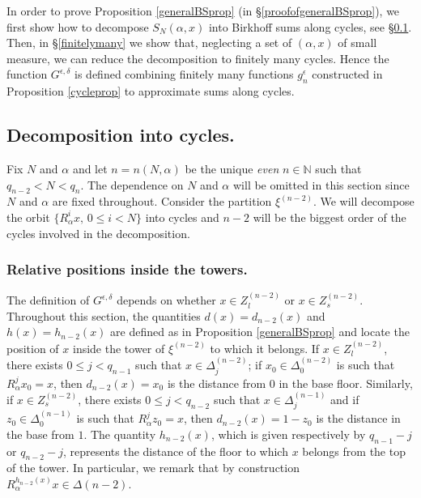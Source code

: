 \documentclass{conm-p-l}
\numberwithin{equation}{section}
\begin{document}
In order to prove Proposition \ref{generalBSprop} (in \S \ref{proofofgeneralBSprop}), we
first show how to decompose ${S_{{N}}({\alpha}, {{x}})}$ into Birkhoff sums along
cycles, see \S\ref{cycledecomp}. Then, in \S\ref{finitelymany} we show that,
neglecting a  set of $(\alpha, {x})$ of small measure, we can reduce the
decomposition to finitely many cycles. Hence the function $G^{\epsilon, \delta}$ is
defined combining finitely many functions  $g_n^{\epsilon} $ constructed in Proposition
\ref{cycleprop} to approximate sums along cycles.

\subsection{Decomposition into cycles.}\label{cycledecomp}
Fix $N$ and $\alpha$ and let $n = n(N, \alpha)$ 
 be the unique \emph{even} $n\in \mathbb{N}$ such that $q_{n-2} < N < q_{n}$. The dependence on $N$ and $\alpha$ will be omitted in this section since $N$ and $\alpha$ are fixed throughout. Consider the partition $\xi^{(n-2)}$. We will decompose the orbit $\{R_{\alpha}^i x, \, 0\leq i < N \}$ into cycles and $n-2$ will be the biggest order of the cycles involved in the decomposition.

\subsubsection{Relative positions inside the towers.}\label{relpos}
The definition of $G^{\epsilon,\delta}$ depends on whether $x \in Z^{(n-2)}_l$ or  $x \in Z^{(n-2)}_s$. Throughout this section, the quantities $d(x)=d_{n-2}(x)$ and $h(x)=h_{n-2}(x)$ are defined as in Proposition \ref{generalBSprop} and locate the position of $x $ inside the tower of $\xi^{(n-2)}$ to which it belongs. If $x\in  Z^{(n-2)}_l$, there exists $0\leq j < q_{n-1}$ such that $x\in \Delta^{(n-2)}_j $; if $x_0 \in \Delta^{(n-2)}_0 $ is such that $R_{\alpha}^j x_0 = x$, then $d_{n-2}(x)=x_0$ is the distance from $0$ in the base floor. Similarly, if $x\in  Z^{(n-2)}_s$,  there exists $0\leq j < q_{n-2}$ such that $x\in \Delta^{(n-1)}_j $ and if $z_0 \in \Delta^{(n-1)}_0 $ is such that $R_{\alpha}^j z_0 = x$, then  $d_{n-2}(x)=1-z_0$ is the distance in the base from $1$. The quantity $h_{n-2}(x)$, which is given respectively by $q_{n-1}-j$ or  $q_{n-2}-j$, represents the distance of the floor to which $x$ belongs from the top of the tower. In particular, we remark that by construction $R_{\alpha}^{h_{n-2}(x)}x \in \Delta(n\!-\!2)$.
\end{document}
